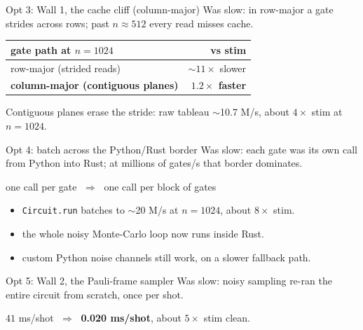 \documentclass[aspectratio=169]{beamer}
\newcommand{\code}[1]{\texttt{#1}}
\begin{document}
\begin{frame}{Opt 3: Wall 1, the cache cliff (column-major)}
  \alert{Was slow:} in row-major a gate strides across rows; past $n\approx512$ every read misses cache.
  \vfill
  \begin{center}
  \begin{tabular}{lr}
    \toprule
    gate path at $n=1024$ & vs stim \\
    \midrule
    row-major (strided reads) & $\sim 11\times$ slower \\
    \textbf{column-major (contiguous planes)} & \textbf{$1.2\times$ faster} \\
    \bottomrule
  \end{tabular}
  \end{center}
  \vfill
  \begin{center}\small Contiguous planes erase the stride: raw tableau $\sim$10.7 M/s, about $4\times$ stim at $n=1024$.\end{center}
\end{frame}

\begin{frame}{Opt 4: batch across the Python/Rust border}
  \alert{Was slow:} each gate was its own call from Python into Rust; at millions of gates/s that border dominates.
  \vfill
  \begin{center}\large one call per gate $\;\Longrightarrow\;$ one call per block of gates\end{center}
  \vfill
  \begin{itemize}
    \item \code{Circuit.run} batches to $\sim$20 M/s at $n=1024$, about $8\times$ stim.
    \item the whole noisy Monte-Carlo loop now runs inside Rust.
    \item custom Python noise channels still work, on a slower fallback path.
  \end{itemize}
\end{frame}

\begin{frame}{Opt 5: Wall 2, the Pauli-frame sampler}
  \alert{Was slow:} noisy sampling re-ran the entire circuit from scratch, once per shot.
  \vfill
  \begin{center}
  \end{center}
  \vfill
  \begin{center}\large $41$ ms/shot $\;\Longrightarrow\;$ \textbf{0.020 ms/shot}, about $5\times$ stim clean.\end{center}
\end{frame}
\end{document}
